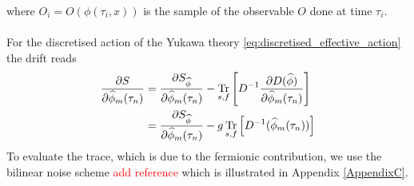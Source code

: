 where $O_i = O(\phi(\tau_i, x))$ is the sample of the observable $O$ done at time $\tau_i$. \\~\\
For the discretised action of the Yukawa theory \eqref{eq:discretised_effective_action} the drift reads
\begin{equation}
    \begin{aligned}
        \frac{\partial S}{\partial \widehat{\phi}_m(\tau_n)} &= \frac{\partial S_{\widehat{\phi}}}{\partial \widehat{\phi}_m(\tau_n)} - \underset{s,f}{\operatorname{\text{Tr}}} \left[D^{-1} \frac{\partial D(\widehat{\phi})}{\partial \widehat{\phi}_m(\tau_n)}\right] \\
        &= \frac{\partial S_{\widehat{\phi}}}{\partial \widehat{\phi}_m(\tau_n)} - g \, \underset{s,f}{\operatorname{\text{Tr}}} \left[D^{-1}(\widehat{\phi}_m(\tau_n))\right]
    \end{aligned}
    \label{eq:drift_continuum_full_theory}
\end{equation}
To evaluate the trace, which is due to the fermionic contribution, we use the bilinear noise scheme \textcolor{red}{add reference} which is illustrated in Appendix \ref{AppendixC}.



